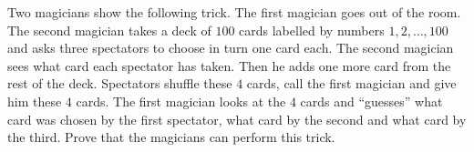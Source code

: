 Two magicians show the following trick. The first magician goes out of the room. The second magician takes a deck of $100$ cards labelled by numbers $1,2,\ldots ,100$ and asks three spectators to choose in turn one card each. The second magician sees what card each spectator has taken. Then he adds one more card from the rest of the deck. Spectators shuffle these $4$ cards, call the first magician and give him these $4$ cards. The first magician looks at the $4$ cards and “guesses” what card was chosen by the first spectator, what card by the second and what card by the third. Prove that the magicians can perform this trick.